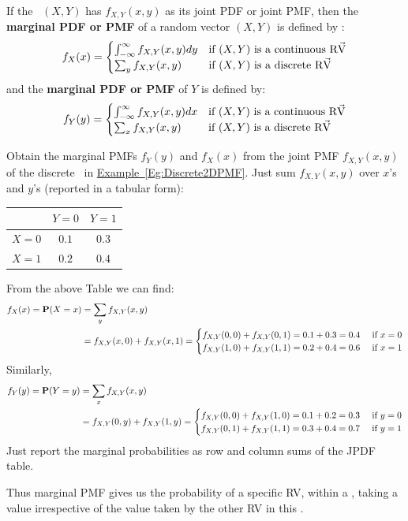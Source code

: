 \begin{definition}
If the \rv~$(X,Y)$ has $f_{X,Y}(x,y)$ as its joint PDF or joint PMF, then the 
{\bf marginal PDF or PMF} of a random vector $(X,Y)$ is defined by :
\[
f_{X}(x) =
\begin{cases}
\int_{-\infty}^{\infty} f_{X,Y}(x,y) dy & \text{if $(X,Y)$ is a continuous {\mbox{R$\vec{\text V}$}}}  \\
\sum_{y} f_{X,Y}(x,y) & \text{if $(X,Y)$ is a discrete {\mbox{R$\vec{\text V}$}}} \\
\end{cases}
\]
and the  {\bf marginal PDF or PMF} of $Y$ is defined by:
\[
f_{Y}(y) = 
\begin{cases}
\int_{-\infty}^{\infty} f_{X,Y}(x,y) dx & \text{if $(X,Y)$ is a continuous {\mbox{R$\vec{\text V}$}}}  \\
\sum_{x} f_{X,Y}(x,y) & \text{if $(X,Y)$ is a discrete {\mbox{R$\vec{\text V}$}}} \\
\end{cases}
\]
\end{definition}

\begin{example}\label{EgGetMarginalFromJointDiscrete}
Obtain the marginal PMFs $f_Y(y)$ and $f_X(x)$ from the joint PMF $f_{X,Y}(x,y)$ of the discrete \rv~in \hyperref[Eg:Discrete2DPMF]{Example~\ref*{Eg:Discrete2DPMF}}.
Just sum $f_{X,Y}(x,y)$ over $x$'s and $y$'s (reported in a tabular form):
\begin{center}
\begin{tabular}{|c|c c|}
\hline
& $Y=0$ & $Y=1$ \\ \hline
$X=0$& $0.1$ & $0.3$  \\
$X=1$& $0.2$ & $0.4$  \\ \hline
\end{tabular}
\end{center}
From the above Table we can find:
\begin{align*}
f_X(x) = \mathbf{P}(X=x) 
&= \sum_{y} f_{X,Y}(x,y) \\
&= 
f_{X,Y}(x,0) + f_{X,Y}(x,1) = 
\begin{cases}
f_{X,Y}(0,0) + f_{X,Y}(0,1) = 0.1+0.3=0.4 & \text{ if } x=0\\
f_{X,Y}(1,0) + f_{X,Y}(1,1) = 0.2+0.4=0.6 & \text{ if } x=1\\
\end{cases}
\end{align*}
Similarly,
\begin{align*}
f_Y(y) = \mathbf{P}(Y=y) 
&= \sum_{x} f_{X,Y}(x,y) \\
&= 
f_{X,Y}(0,y) + f_{X,Y}(1,y) 
= 
\begin{cases}
f_{X,Y}(0,0) + f_{X,Y}(1,0) = 0.1+0.2=0.3 & \text{ if } y=0\\
f_{X,Y}(0,1) + f_{X,Y}(1,1) = 0.3+0.4=0.7 & \text{ if } y=1\\
\end{cases}
\end{align*}
Just report the marginal probabilities as row and column sums of the JPDF table.

Thus marginal PMF gives us the probability of a specific RV, within a \rv, taking a value irrespective of the value taken by the other RV in this \rv. 
\end{example}

